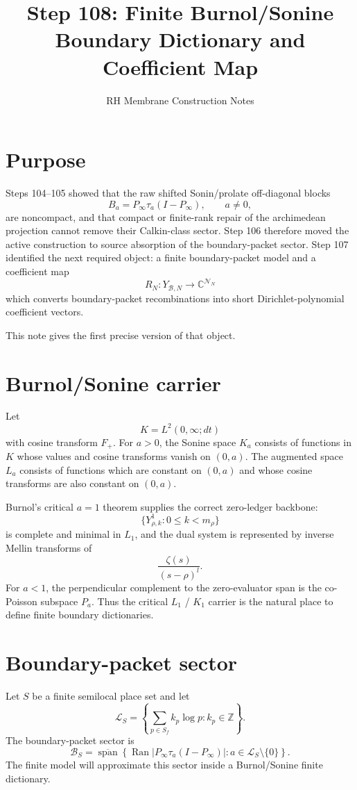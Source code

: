 \documentclass[11pt]{article}
\title{Step 108: Finite Burnol/Sonine Boundary Dictionary and Coefficient Map}
\author{RH Membrane Construction Notes}
\date{}
\newcommand{\cB}{\mathcal B}
\newcommand{\cN}{\mathcal N}
\newcommand{\Ran}{\operatorname{Ran}}
\newcommand{\Span}{\operatorname{span}}
\begin{document}
\maketitle

\section{Purpose}

Steps 104--105 showed that the raw shifted Sonin/prolate off-diagonal blocks
\[
        B_a=P_\infty\tau_a(I-P_\infty),\qquad a\ne0,
\]
are noncompact, and that compact or finite-rank repair of the archimedean projection cannot remove their Calkin-class sector. Step 106 therefore moved the active construction to source absorption of the boundary-packet sector. Step 107 identified the next required object: a finite boundary-packet model and a coefficient map
\[
        R_N:Y_{\cB,N}\longrightarrow \mathbb C^{\cN_N}
\]
which converts boundary-packet recombinations into short Dirichlet-polynomial coefficient vectors.

This note gives the first precise version of that object.

\section{Burnol/Sonine carrier}

Let
\[
        K=L^2(0,\infty;dt)
\]
with cosine transform \(F_+\). For \(a>0\), the Sonine space \(K_a\) consists of functions in \(K\) whose values and cosine transforms vanish on \((0,a)\). The augmented space \(L_a\) consists of functions which are constant on \((0,a)\) and whose cosine transforms are also constant on \((0,a)\).

Burnol's critical \(a=1\) theorem supplies the correct zero-ledger backbone:
\[
        \{Y_{\rho,k}^{1}: 0\le k<m_\rho\}
\]
is complete and minimal in \(L_1\), and the dual system is represented by inverse Mellin transforms of
\[
        \frac{\zeta(s)}{(s-\rho)^l}.
\]
For \(a<1\), the perpendicular complement to the zero-evaluator span is the co-Poisson subspace \(P_a\). Thus the critical \(L_1\) / \(K_1\) carrier is the natural place to define finite boundary dictionaries.

\section{Boundary-packet sector}

Let \(S\) be a finite semilocal place set and let
\[
        \mathcal L_S
        =
        \left\{
        \sum_{p\in S_f}k_p\log p:k_p\in\mathbb Z
        \right\}.
\]
The boundary-packet sector is
\[
        \cB_S
        =
        \overline{\Span}
        \left\{
        \Ran |P_\infty\tau_a(I-P_\infty)|:
        a\in\mathcal L_S\setminus\{0\}
        \right\}.
\]
The finite model will approximate this sector inside a Burnol/Sonine finite dictionary.
\end{document}

